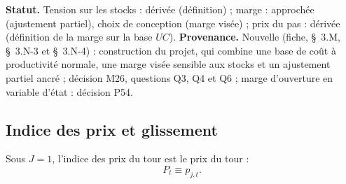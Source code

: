 \documentclass[11pt,a4paper]{article}
\begin{document}
\textbf{Statut.} Tension sur les stocks : dérivée (définition) ; marge : approchée (ajustement partiel), choix de conception (marge visée) ; prix du pas : dérivée (définition de la marge sur la base $\mathit{UC}$). \textbf{Provenance.} Nouvelle (fiche, \S~3.M, \S~3.N-3 et \S~3.N-4) : construction du projet, qui combine une base de coût à productivité normale, une marge visée sensible aux stocks et un ajustement partiel ancré ; décision M26, questions Q3, Q4 et Q6 ; marge d'ouverture en variable d'état : décision P54.

\subsection{Indice des prix et glissement}
\label{sec:prix-indice}
Sous $J = 1$, l'indice des prix du tour est le prix du tour :
\begin{equation}\label{eq:prix-indice}
P_t \equiv p_{j,t} .
\end{equation}
\end{document}
